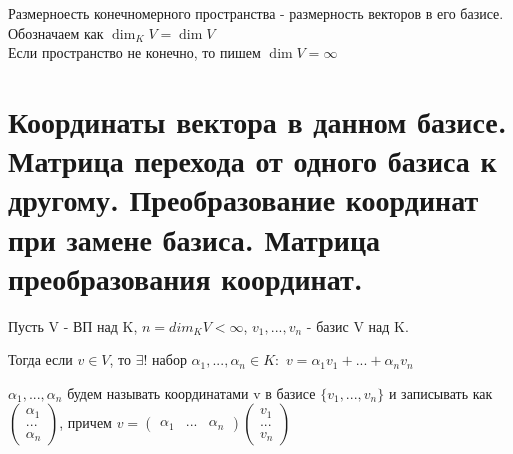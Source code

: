\documentclass[12pt, fleqn]{article}
\begin{document}
		\begin{definition}
				Размерноесть конечномерного пространства - размерность векторов в его базисе.\\
        Обозначаем как $\dim_K V = \dim V$\\
        Если пространство не конечно, то пишем $\dim V = \infty$
		\end{definition}


\section{Координаты вектора в данном базисе. Матрица перехода от одного базиса к другому. Преобразование координат при замене базиса. Матрица преобразования координат.}
        \begin{theorem}
        Пусть V - ВП над K, $n = dim_K V < \infty$, $v_1, ..., v_n$ - базис V над K.

        Тогда если $v \in V$, то $\exists!$ набор $\alpha_1, ..., \alpha_n \in K:$ $v=\alpha_1 v_1+...+\alpha_n v_n$
        \end{theorem}

        \begin{definition}
        $\alpha_1,...,\alpha_n$ будем называть координатами v в базисе $\{v_1,...,v_n\}$ и записывать как
        $\begin{pmatrix}
        \alpha_1\\
        ...\\
        \alpha_n
        \end{pmatrix}$, причем $v=
        \begin{pmatrix} \alpha_1&...&\alpha_n \end{pmatrix}
        \begin{pmatrix}
        v_1\\
        ...\\
        v_n
        \end{pmatrix}$
        \end{definition}
\end{document}
